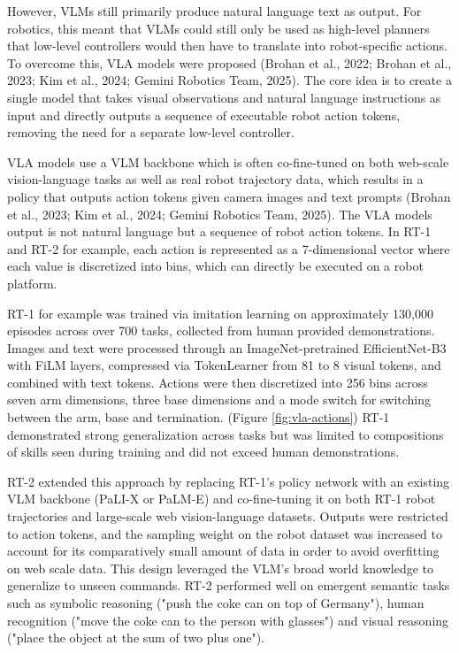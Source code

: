 \documentclass[11pt]{article}
\begin{document}
However, VLMs still primarily produce natural language text as output. For robotics, this meant that VLMs could still only be used as high-level planners that low-level controllers would then have to translate into robot-specific actions. To overcome this, VLA models were proposed (Brohan et al., 2022; Brohan et al., 2023; Kim et al., 2024; Gemini Robotics Team, 2025). The core idea is to create a single model that takes visual observations and natural language instructions as input and directly outputs a sequence of executable robot action tokens, removing the need for a separate low-level controller.

VLA models use a VLM backbone which is often co-fine-tuned on both web-scale vision-language tasks as well as real robot trajectory data, which results in a policy that outputs action tokens given camera images and text prompts (Brohan et al., 2023; Kim et al., 2024; Gemini Robotics Team, 2025).
The VLA models output is not natural language but a sequence of robot action tokens. In RT-1 and RT-2 for example, each action is represented as a 7-dimensional vector where each value is discretized into bins, which can directly be executed on a robot platform.

RT-1 for example was trained via imitation learning on approximately 130,000 episodes across over 700 tasks, collected from human provided demonstrations. 
Images and text were processed through an ImageNet-pretrained EfficientNet-B3 with FiLM layers, compressed via TokenLearner from 81 to 8 visual tokens, and combined with text tokens. Actions were then discretized into 256 bins across seven arm dimensions, three base dimensions and a mode switch for switching between the arm, base and termination. (Figure \ref{fig:vla-actions}) 
\newline
RT-1 demonstrated strong generalization across tasks but was limited to compositions of skills seen during training and did not exceed human demonstrations.

RT-2 extended this approach by replacing RT-1's policy network with an existing VLM backbone (PaLI-X or PaLM-E) and co-fine-tuning it on both RT-1 robot trajectories and large-scale web vision-language datasets. Outputs were restricted to action tokens, and the sampling weight on the robot dataset was increased to account for its comparatively small amount of data in order to avoid overfitting on web scale data. This design leveraged the VLM's broad world knowledge to generalize to unseen commands. RT-2 performed well on emergent semantic tasks such as symbolic reasoning ("push the coke can on top of Germany"), human recognition ("move the coke can to the person with glasses") and visual reasoning ("place the object at the sum of two plus one").
\end{document}
